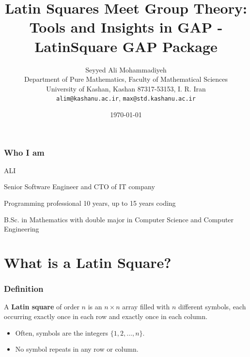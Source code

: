 \documentclass{beamer}
\title{Latin Squares Meet Group Theory: Tools and Insights in GAP - LatinSquare GAP Package}
\author[S. A. Mohammadiyeh]{Seyyed Ali Mohammadiyeh\\
Department of Pure Mathematics, Faculty of Mathematical Sciences\\
University of Kashan, Kashan 87317-53153, I. R. Iran\\
\texttt{alim@kashanu.ac.ir}, \texttt{max@std.kashanu.ac.ir}}
\date{\today}
\begin{document}
\begin{frame}
  \titlepage
\end{frame}

\begin{frame}
  \frametitle{Who I am}
  ALI
  \begin{listings}
	\item Senior Software Engineer and CTO of IT company
	\item Programming professional 10 years, up to 15 years coding
	\item B.Sc. in Mathematics with double major in Computer Science and Computer Engineering
  \end{listings}
\end{frame}


\section{What is a Latin Square?}

\begin{frame}
\frametitle{Definition}
A \textbf{Latin square} of order $n$ is an $n \times n$ array filled with $n$ different symbols, each occurring exactly once in each row and exactly once in each column.
\pause
\begin{itemize}
  \item Often, symbols are the integers $\{1, 2, \dots, n\}$.
  \item No symbol repeats in any row or column.
\end{itemize}
\end{frame}


\end{document}

